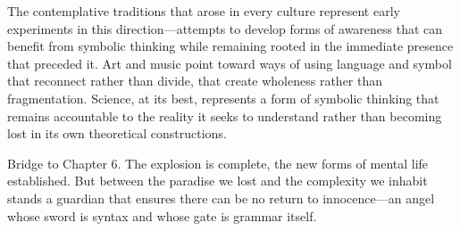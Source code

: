 The contemplative traditions that arose in every culture represent early experiments in this direction—attempts to develop forms of awareness that can benefit from symbolic thinking while remaining rooted in the immediate presence that preceded it. Art and music point toward ways of using language and symbol that reconnect rather than divide, that create wholeness rather than fragmentation. Science, at its best, represents a form of symbolic thinking that remains accountable to the reality it seeks to understand rather than becoming lost in its own theoretical constructions.

\bigskip
\noindent Bridge to Chapter 6. The explosion is complete, the new forms of mental life established. But between the paradise we lost and the complexity we inhabit stands a guardian that ensures there can be no return to innocence—an angel whose sword is syntax and whose gate is grammar itself.
